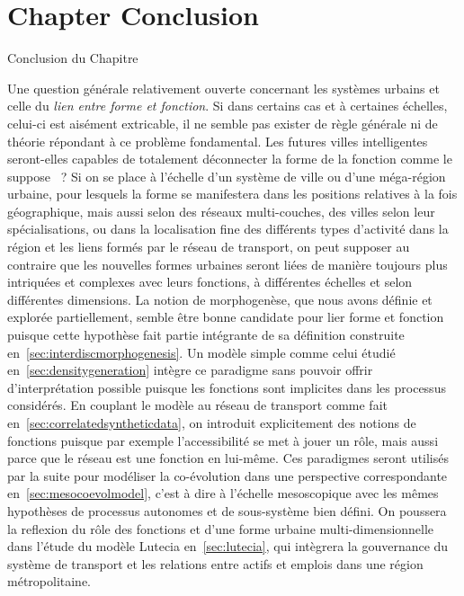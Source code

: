 




\newpage


\section*{Chapter Conclusion}{Conclusion du Chapitre}



Une question générale relativement ouverte concernant les systèmes urbains et celle du \emph{lien entre forme et fonction}. Si dans certains cas et à certaines échelles, celui-ci est aisément extricable, il ne semble pas exister de règle générale ni de théorie répondant à ce problème fondamental. Les futures villes intelligentes seront-elles capables de totalement déconnecter la forme de la fonction comme le suppose~\cite{batty2017age} ? Si on se place à l'échelle d'un système de ville ou d'une méga-région urbaine, pour lesquels la forme se manifestera dans les positions relatives à la fois géographique, mais aussi selon des réseaux multi-couches, des villes selon leur spécialisations, ou dans la localisation fine des différents types d'activité dans la région et les liens formés par le réseau de transport, on peut supposer au contraire que les nouvelles formes urbaines seront liées de manière toujours plus intriquées et complexes avec leurs fonctions, à différentes échelles et selon différentes dimensions. La notion de morphogenèse, que nous avons définie et explorée partiellement, semble être bonne candidate pour lier forme et fonction puisque cette hypothèse fait partie intégrante de sa définition construite en~\ref{sec:interdiscmorphogenesis}. Un modèle simple comme celui étudié en~\ref{sec:densitygeneration} intègre ce paradigme sans pouvoir offrir d'interprétation possible puisque les fonctions sont implicites dans les processus considérés. En couplant le modèle au réseau de transport comme fait en~\ref{sec:correlatedsyntheticdata}, on introduit explicitement des notions de fonctions puisque par exemple l'accessibilité se met à jouer un rôle, mais aussi parce que le réseau est une fonction en lui-même. Ces paradigmes seront utilisés par la suite pour modéliser la co-évolution dans une perspective correspondante en~\ref{sec:mesocoevolmodel}, c'est à dire à l'échelle mesoscopique avec les mêmes hypothèses de processus autonomes et de sous-système bien défini. On poussera la reflexion du rôle des fonctions et d'une forme urbaine multi-dimensionnelle dans l'étude du modèle Lutecia en~\ref{sec:lutecia}, qui intègrera la gouvernance du système de transport et les relations entre actifs et emplois dans une région métropolitaine.




\stars



